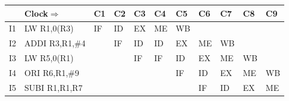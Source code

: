 \documentclass{beamer}
\renewcommand{\emph}[1]{\textcolor{structure}{#1}}
\newcommand{\emp}[1]{\textcolor{DikuRed}{ #1}}
\begin{document}
\begin{frame}[fragile,t]
\begin{scriptsize}
\begin{tabular}{lllllllllll}
\hline
   & Clock$\Rightarrow$ & C1 & C2 & C3 & C4 & C5 & C6 & C7 & C8 & C9 \\\hline
I1 & LW   R1,0(R3)      & IF & ID & EX & ME & \emp{WB}&    &    &    &    \\
I2 & ADDI R3,R1,\#4     &    & IF & ID & ID &\emph{EX} & ME & WB &    &   \\
I3 & LW   R5,0(R1)      &    &    & IF & IF & ID & \emph{EX} & ME & WB &   \\
I4 & ORI  R6,R1,\#9     &    &    &    &    & IF & \emph{ID} & EX & ME & WB\\
I5 & SUBI R1,R1,R7      &    &    &    &    &    & IF & ID & EX & ME       \\\hline
\end{tabular}
\end{scriptsize} 

\end{frame}
\end{document}
